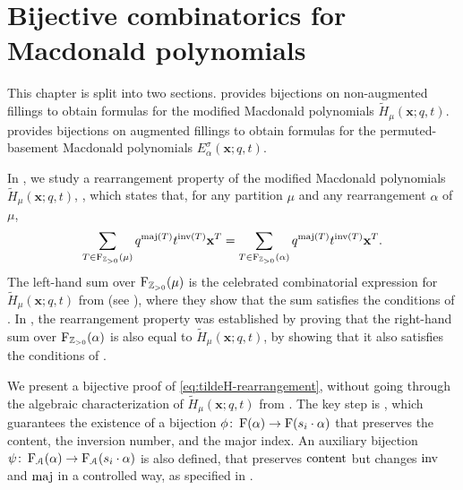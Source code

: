 \chapter{Bijective combinatorics for Macdonald polynomials} \label{chap:bijective}

This chapter is split into two sections.  provides bijections on non-augmented fillings to obtain formulas for the modified Macdonald polynomials \(\tilde{H}_\mu(\mathbf{x}; q, t)\).
 provides bijections on augmented fillings to obtain formulas for the permuted-basement Macdonald polynomials \(E_\alpha^\sigma(\mathbf{x}; q, t)\).

In ,
we study a rearrangement property of the modified Macdonald polynomials \(\tilde{H}_\mu(\mathbf{x}; q, t)\),
,
which states that, for any partition \(\mu\) and any rearrangement \(\alpha\) of \(\mu\),
\begin{equation} \label{eq:tildeH-rearrangement}
    \sum_{T \in \Fill[\positives](\mu)} q^{\maj(T)} t^{\inv(T)} \mathbf{x}^T
    =
    \sum_{T \in \Fill[\positives](\alpha)} q^{\maj(T)} t^{\inv(T)} \mathbf{x}^T.
\end{equation}
The left-hand sum over \(\Fill[\positives](\mu)\) is the celebrated combinatorial expression for \(\tilde{H}_{\mu}(\mathbf{x}; q, t)\) from \cite{HHL05} (see ), where they show that the sum satisfies the conditions of .
In \cite{HHL08}, the rearrangement property was established by proving that the right-hand sum over \(\Fill[\positives](\alpha)\) is also equal to \(\tilde{H}_{\mu}(\mathbf{x}; q, t)\),
by showing that it also satisfies the conditions of .

We present a bijective proof of \eqref{eq:tildeH-rearrangement}, without going through the algebraic characterization of
\(\tilde{H}_\mu(\mathbf{x}; q, t)\) from .
The key step is ,
which guarantees the existence of a bijection \(\phi \colon \Fill(\alpha) \to \Fill(s_i \permact \alpha)\) that preserves the content, the inversion number, and the major index.
An auxiliary bijection \(\psi \colon \Fill[\mathcal{A}](\alpha) \to \Fill[\mathcal{A}](s_i \permact \alpha)\) is also defined, that preserves \(\operatorname{content}\) but changes \(\inv\) and \(\maj\) in a controlled way, as specified in .

